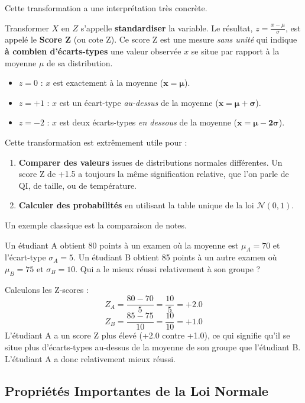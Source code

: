 Cette transformation a une interprétation très concrète.

\begin{intuitionbox}
Transformer $X$ en $Z$ s'appelle \textbf{standardiser} la variable. Le résultat, $z = \frac{x-\mu}{\sigma}$, est appelé le \textbf{Score Z} (ou cote Z). Ce score Z est une mesure \textit{sans unité} qui indique \textbf{à combien d'écarts-types} une valeur observée $x$ se situe par rapport à la moyenne $\mu$ de sa distribution.
\begin{itemize}
    \item $z = 0$ : $x$ est exactement à la moyenne ($\mathbf{x = \mu}$).
    \item $z = +1$ : $x$ est un écart-type \textit{au-dessus} de la moyenne ($\mathbf{x = \mu + \sigma}$).
    \item $z = -2$ : $x$ est deux écarts-types \textit{en dessous} de la moyenne ($\mathbf{x = \mu - 2\sigma}$).
\end{itemize}
Cette transformation est extrêmement utile pour :
\begin{enumerate}
    \item \textbf{Comparer des valeurs} issues de distributions normales différentes. Un score Z de +1.5 a toujours la même signification relative, que l'on parle de QI, de taille, ou de température.
    \item \textbf{Calculer des probabilités} en utilisant la table unique de la loi $\mathcal{N}(0, 1)$.
\end{enumerate}
\end{intuitionbox}

Un exemple classique est la comparaison de notes.

\begin{examplebox}
Un étudiant A obtient 80 points à un examen où la moyenne est $\mu_A=70$ et l'écart-type $\sigma_A=5$. Un étudiant B obtient 85 points à un autre examen où $\mu_B=75$ et $\sigma_B=10$. Qui a le mieux réussi relativement à son groupe ?

Calculons les Z-scores :
$$ Z_A = \frac{80 - 70}{5} = \frac{10}{5} = +2.0 $$
$$ Z_B = \frac{85 - 75}{10} = \frac{10}{10} = +1.0 $$
L'étudiant A a un score Z plus élevé (+2.0 contre +1.0), ce qui signifie qu'il se situe plus d'écarts-types au-dessus de la moyenne de son groupe que l'étudiant B. L'étudiant A a donc relativement mieux réussi.
\end{examplebox}

\subsection{Propriétés Importantes de la Loi Normale}

